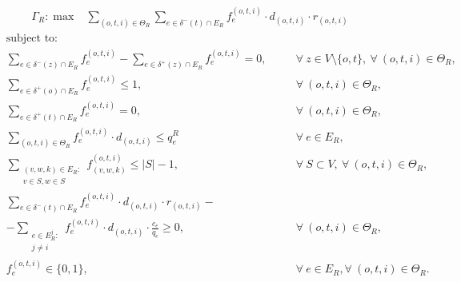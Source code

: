 \documentclass[review]{elsarticle}
\begin{document}
  \begin{align}
        &  \Gamma_R: \max  & \sum_{(o,t,i) \in \Theta_R} \sum_{e \in \delta^-(t)\cap E_R}  f_e^{(o,t,i)} \cdot d_{(o,t,i)} \cdot r_{(o,t,i)} &&   
    \end{align}
    \begin{align}
        & \text{subject to:}       && \nonumber\\
        & \sum_{e \in \delta^-(z)\cap E_R} f_e^{(o,t,i)}-\sum_{e \in \delta^+(z)\cap E_R} f_{e}^{(o,t,i)}  = 0,           \quad && \forall\ z\in V\setminus\{o,t\},\ \forall\ (o,t,i)\in\Theta_R, \\[1em]
& \sum_{e \in \delta^+(o)\cap E_R} f_e^{(o,t,i)}\leq 1, && \forall\ (o,t,i)\in \Theta_R,  \\
& \sum_{e \in \delta^+(t)\cap E_R} f_e^{(o,t,i)}  = 0, && \forall\ (o,t,i)\in \Theta_R,  \\
 & \sum_{(o,t,i) \in \Theta_R} f_e^{(o,t,i)}\cdot d_{(o,t,i)} \leq q_e^R   &&\forall\ e \in E_R,   \\
& \sum_{\substack{(v,w,k)\in E_R\colon\\v\in S,w \in S }} f_{(v,w,k)}^{(o,t,i)} \leq |S| -1,  && \forall\ S \subset V, \ \forall\ (o,t,i) \in \Theta_R, \\
& \sum_{e \in \delta^-(t)\cap E_R}  f_e^{(o,t,i)}  \cdot d_{(o,t,i)} \cdot r_{(o,t,i)} - && \nonumber\\
& -\sum_{\substack{e \in E_R^j\colon \\ j\not = i}} f_e^{(o,t,i)} \cdot d_{(o,t,i)} \cdot \frac{c_e}{q_e}\geq 0, && \forall\ (o,t,i) \in \Theta_R, \\
& f_e^{(o,t,i)} \in \{0,1\},    && \forall\ e \in E_R, \forall\ (o,t,i) \in \Theta_R.
    \end{align}
\end{document}
